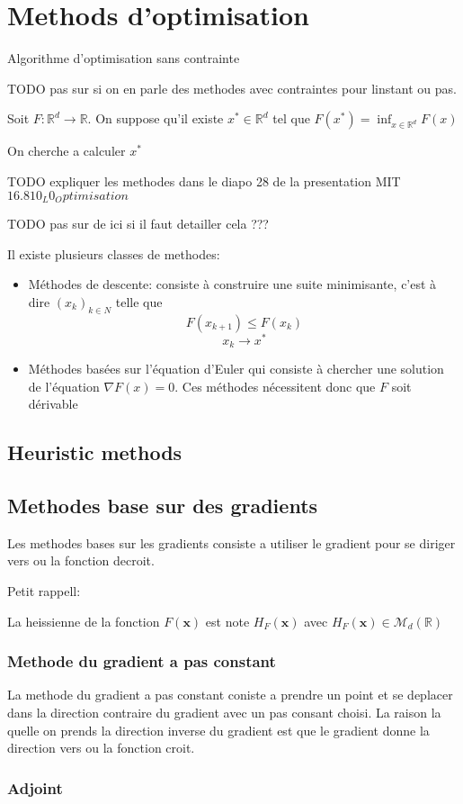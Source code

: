 \chapter{Methods d'optimisation}

Algorithme d'optimisation sans contrainte 

TODO pas sur si on en parle des methodes avec contraintes pour linstant ou pas.

Soit $F:\mathbb{R}^d \rightarrow \mathbb{R}$. On suppose qu'il existe $x^* \in \mathbb{R}^d$ tel que $F(x^*) = \inf_{x \in \mathbb{R}^d} F(x)$

On cherche a calculer $x^*$

TODO expliquer les methodes dans le diapo 28 de la presentation MIT $16.810_L0_Optimisation$

TODO pas sur de ici si il faut detailler cela ???

Il existe plusieurs classes de methodes:
\begin{itemize}
    \item  Méthodes de descente: consiste à construire une suite minimisante, c'est à dire $(x_k)_{k\in N}$ telle que 
    $$ F(x_{k+1}) \leq F(x_k) $$
    $$x_k \rightarrow x^* $$
    
    \item Méthodes basées sur l'équation d'Euler qui consiste à chercher une solution de l'équation $\nabla F(x) = 0$. Ces méthodes nécessitent donc que $F$ soit dérivable
\end{itemize} 
\section{Heuristic methods}
\section{Methodes base sur des gradients} \label{grad_methods}
Les methodes bases sur les gradients consiste a utiliser le gradient pour se diriger vers ou la fonction decroit. 

Petit rappell: 

La heissienne de la fonction $F(\bm{x})$ est note $H_F(\bm x)$ avec $H_F(\bm x)\in \mathcal{M}_d(\mathbb{R})$



\subsection{Methode du gradient a pas constant}
La methode du gradient a pas constant coniste a prendre un point et se deplacer dans la direction contraire du gradient avec un pas consant choisi. La raison la quelle on prends la direction inverse du gradient est que le gradient donne la direction vers ou la fonction croit.
\subsection{}
\subsection{Adjoint}